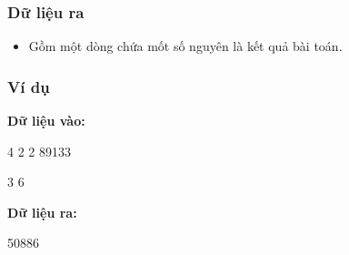 \subsubsection{    Dữ liệu ra   }


\begin{itemize}
	\item      Gồm một dòng chứa mốt số nguyên là kết quả bài toán.    
\end{itemize}



\subsubsection{    Ví dụ   }



\textbf{     Dữ liệu vào:    }

    4 2 2 89133   

    3 6   

\textbf{     Dữ liệu ra:    }

    50886   




